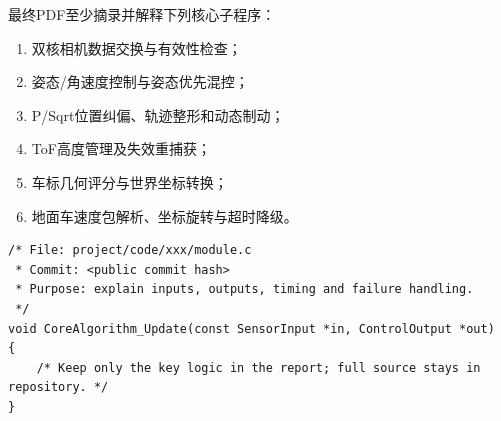 最终PDF至少摘录并解释下列核心子程序：
\begin{enumerate}
  \item 双核相机数据交换与有效性检查；
  \item 姿态/角速度控制与姿态优先混控；
  \item P/Sqrt位置纠偏、轨迹整形和动态制动；
  \item ToF高度管理及失效重捕获；
  \item 车标几何评分与世界坐标转换；
  \item 地面车速度包解析、坐标旋转与超时降级。
\end{enumerate}

\begin{lstlisting}[caption={核心代码摘录格式示例（定稿时替换）}]
/* File: project/code/xxx/module.c
 * Commit: <public commit hash>
 * Purpose: explain inputs, outputs, timing and failure handling.
 */
void CoreAlgorithm_Update(const SensorInput *in, ControlOutput *out)
{
    /* Keep only the key logic in the report; full source stays in repository. */
}
\end{lstlisting}

